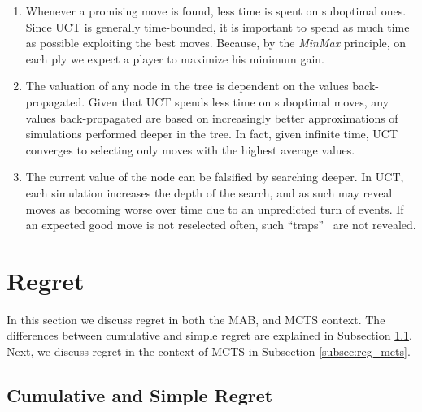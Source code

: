 \documentclass[a4paper]{llncs}
\begin{document}
\begin{enumerate} 

\item Whenever a promising move is found, less time is spent on suboptimal ones. Since UCT is generally time-bounded, it is important to spend as much time as possible exploiting the best moves. Because, by the \emph{MinMax} principle, on each ply we expect a player to maximize his minimum gain. 

\item The valuation of any node in the tree is dependent on the values back-propagated. 
Given that UCT spends less time on suboptimal moves, any values back-propagated are based on increasingly better approximations of simulations performed deeper in the tree. In fact, given infinite time, UCT converges to selecting only moves with the highest average values.

\item The current value of the node can be falsified by searching deeper. In UCT, each simulation increases the depth of the search, and as such may reveal moves as becoming worse over time due to an unpredicted turn of events. If an expected good move is not reselected often, such ``traps''~\cite{Ramanujan2010a} are not revealed.

\end{enumerate}


\section{Regret}
\label{sec:regret}
In this section we discuss regret in both the MAB, and MCTS context. The differences between cumulative and simple regret are explained in Subsection \ref{subsec:cumsimregret}. Next, we discuss regret in the context of MCTS in Subsection \ref{subsec:reg_mcts}.

\subsection{Cumulative and Simple Regret}
\label{subsec:cumsimregret}
\end{document}
